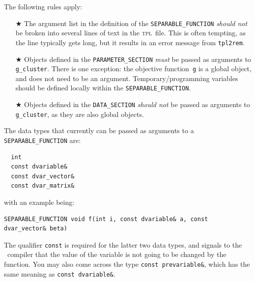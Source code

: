 \documentclass{admbmanual}
\begin{document}
The following rules apply:
\begin{itemize}
\item[$\bigstar$] The argument list in the definition of the \texttt{SEPARABLE\_FUNCTION} \textit{should not} be broken
	          into several lines of text in the \textsc{tpl}~file. This is often tempting, as the line typically gets long,
  		  but it results in an error message from \texttt{tpl2rem}.
\item[$\bigstar$] Objects defined in the \texttt{PARAMETER\_SECTION} \textit{must} be 
		  passed as arguments to \texttt{g\_cluster}. There is one exception: 
		  the objective function~\texttt{g} is a global object, and does not need to be an argument.
                  Temporary/programming variables should be defined locally within the \texttt{SEPARABLE\_FUNCTION}.
\item[$\bigstar$] Objects defined in the \texttt{DATA\_SECTION} \textit{should not} be passed as arguments
		  to \texttt{g\_cluster}, as they are also global objects.
\end{itemize}
The data types that currently can be passed as arguments to a \texttt{SEPARABLE\_FUNCTION} are:
\begin{lstlisting}
  int
  const dvariable&
  const dvar_vector&
  const dvar_matrix&
\end{lstlisting}
with an example being:
\begin{lstlisting}
SEPARABLE_FUNCTION void f(int i, const dvariable& a, const dvar_vector& beta)
\end{lstlisting}
The qualifier \texttt{const} is required for the latter two data types, and signals to the 
\cplus~compiler that the value of the variable is not going to be changed by the function.
You may also come across the type \texttt{const prevariable\&}, which has the same meaning as 
\texttt{const dvariable\&}.
\end{document}
